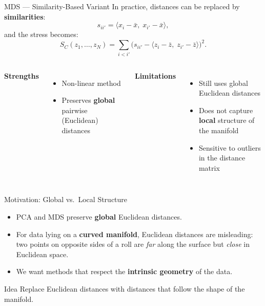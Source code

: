 \documentclass[aspectratio=169,t]{beamer}
\begin{document}
\begin{frame}{MDS --- Similarity-Based Variant}
  In practice, distances can be replaced by \textbf{similarities}:
  \[
    s_{ii'} = \langle x_i - \bar{x},\; x_{i'} - \bar{x} \rangle,
  \]
  and the stress becomes:
  \[
    S_C(z_1,\ldots,z_N)
    = \sum_{i < i'} \bigl(s_{ii'} - \langle z_i - \bar{z},\; z_{i'} - \bar{z}\rangle\bigr)^2.
  \]

  \vspace{0.3cm}
  \begin{columns}[T]
    \textcolor{accentred}{\bfseries Strengths}
    \begin{itemize}
      \item Non-linear method
      \item Preserves \textbf{global} pairwise (Euclidean) distances
    \end{itemize}

    \textcolor{accentred}{\bfseries Limitations}
    \begin{itemize}
      \item Still uses global Euclidean distances
      \item Does not capture \textbf{local} structure of the manifold
      \item Sensitive to outliers in the distance matrix
    \end{itemize}
  \end{columns}
\end{frame}



\begin{frame}{Motivation: Global vs.\ Local Structure}
  \begin{itemize}
    \setlength{\itemsep}{0.4cm}
    \item PCA and MDS preserve \textbf{global} Euclidean distances.
    \item For data lying on a \textbf{curved manifold}, Euclidean distances are misleading: two points on opposite sides of a roll are \emph{far} along the surface but \emph{close} in Euclidean space.
    \item We want methods that respect the \textbf{intrinsic geometry} of the data.
  \end{itemize}

  \vspace{0.5cm}
  \begin{block}{Idea}
    Replace Euclidean distances with distances that follow the shape of the manifold.
  \end{block}
\end{frame}
\end{document}
